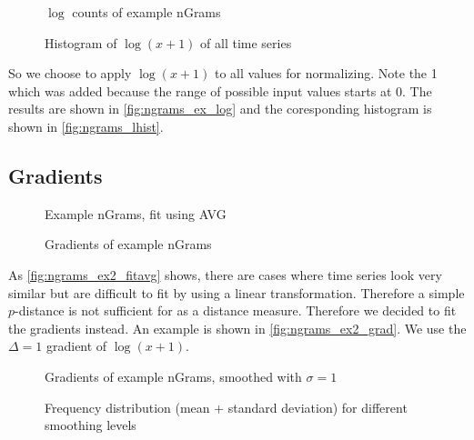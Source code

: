 \begin{figure}
    \centering
    
    \caption{$\log$ counts of example nGrams}
    \label{fig:ngrams_ex_log}
\end{figure}

\begin{figure}
    \centering
    
    \caption{Histogram of $\log(x + 1)$ of all time series}
    \label{fig:ngrams_lhist}
\end{figure}

So we choose to apply $\log(x + 1)$ to all values for normalizing. Note the \num{1} which was added because the range of possible input values starts at \num{0}. The results are shown in \autoref{fig:ngrams_ex_log} and the coresponding histogram is shown in \autoref{fig:ngrams_lhist}.


\subsection{Gradients}
\label{ssec:baseline:sim:grad}

\begin{figure}
    \centering
    
    \caption{Example nGrams, fit using AVG}
    \label{fig:ngrams_ex2_fitavg}
\end{figure}

\begin{figure}
    \centering
    
    \caption{Gradients of example nGrams}
    \label{fig:ngrams_ex2_grad}
\end{figure}

As \autoref{fig:ngrams_ex2_fitavg} shows, there are cases where time series look very similar but are difficult to fit by using a linear transformation. Therefore a simple $p$-distance is not sufficient for as a distance measure. Therefore we decided to fit the gradients instead. An example is shown in \autoref{fig:ngrams_ex2_grad}. We use the $\Delta = 1$ gradient of $\log(x + 1)$.

\begin{figure}
    \centering
    
    \caption{Gradients of example nGrams, smoothed with $\sigma = 1$}
    \label{fig:ngrams_ex2_grad_smooth}
\end{figure}

\begin{figure}
    \centering
    
    \caption{Frequency distribution (mean + standard deviation) for different smoothing levels}
    \label{fig:smoothing_frequencies}
\end{figure}

